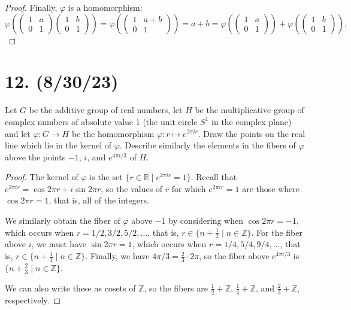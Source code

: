 \documentclass{article}
\begin{document}
\begin{enumerate}[label=(\alph*), itemsep=0em]
\begin{proof}
            Finally, $\varphi$ is a homomorphism:
            \begin{equation*}
                \varphi(\begin{pmatrix}1 & a \\ 0 & 1\end{pmatrix}\begin{pmatrix}1 & b \\ 0 & 1\end{pmatrix}) = \varphi(\begin{pmatrix}1 & a + b \\ 0 & 1\end{pmatrix}) = a + b = \varphi(\begin{pmatrix}1 & a \\ 0 & 1\end{pmatrix}) + \varphi(\begin{pmatrix}1 & b \\ 0 & 1\end{pmatrix}).
            \end{equation*}
          \end{proof}
\end{enumerate}

\section*{12. (8/30/23)}

Let $G$ be the additive group of real numbers, let $H$ be the multiplicative group of complex numbers of absolute value 1 (the unit circle $S^1$ in the complex plane) and let $\varphi: G \rightarrow H$ be the homomorphism $\varphi: r \mapsto e^{2 \pi i r}$. Draw the points on the real line which lie in the kernel of $\varphi$. Describe similarly the elements in the fibers of $\varphi$ above the points $-1$, $i$, and $e^{4 \pi i / 3}$ of $H$.

\begin{proof}
    The kernel of $\varphi$ is the set $\{ r \in \mathbb{R} \mid e^{2 \pi i r} = 1 \}$. Recall that $e^{2 \pi i r} = \cos{2 \pi r} + i \sin{2 \pi r}$, so the values of $r$ for which $e^{2 \pi i r} = 1$ are those where $\cos{2 \pi r} = 1$, that is, all of the integers.

    We similarly obtain the fiber of $\varphi$ above $-1$ by considering when $\cos{2 \pi r} = -1$, which occurs when $r = 1/2, 3/2, 5/2, ...$, that is, $r \in \{ n + \frac{1}{2} \mid n \in \mathbb{Z} \}$. For the fiber above $i$, we must have $\sin{2 \pi r} = 1$, which occurs when $r = 1/4, 5/4, 9/4, ...$, that is, $r \in \{ n + \frac{1}{4} \mid n \in \mathbb{Z} \}$. Finally, we have $4 \pi / 3 = \frac{2}{3} \cdot 2 \pi$, so the fiber above $e^{4 \pi i / 3}$ is $\{ n + \frac{2}{3} \mid n \in \mathbb{Z} \}$.

    We can also write these as cosets of $\mathbb{Z}$, so the fibers are $\frac{1}{2} + \mathbb{Z}$, $\frac{1}{4} + \mathbb{Z}$, and $\frac{2}{3} + \mathbb{Z}$, respectively.
\end{proof}
\end{document}
